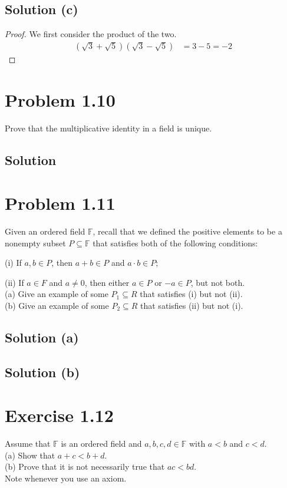 \documentclass[12pt]{report}
\begin{document}
\subsection{Solution (c)}
\begin{proof}
    We first consider the product of the two.
    \begin{align}
        (\sqrt{3} + \sqrt{5})(\sqrt{3} - \sqrt{5})
            &=  3 - 5
            =   -2
    \end{align}
\end{proof}

\pagebreak
\section{Problem 1.10}
Prove that the multiplicative identity in a field is unique. 

\subsection{Solution}


\pagebreak
\section{Problem 1.11}
Given an ordered field $\mathbb{F}$, recall that we defined the positive elements to be a nonempty subset $P \subseteq \mathbb{F}$ that satisfies both of the following conditions:

(i) If $a, b \in P$, then $a + b \in P$ and $a \cdot b \in P$;  

(ii) If $a \in F$ and $a \ne 0$, then either $a \in P$ or $-a \in P$, but not  both. \\
(a) Give an example of some $P_1 \subseteq R$ that satisfies (i) but not (ii).\\
(b) Give an example of some $P_2 \subseteq R$ that satisfies (ii) but not (i). 

\subsection{Solution (a)}

\subsection{Solution (b)}


\pagebreak
\section{Exercise 1.12}
Assume that $\mathbb{F}$ is an ordered field and $a, b, c, d \in \mathbb{F}$ with $a<b$ and $c<d$. \\
(a) Show that $a + c < b + d$. \\
(b) Prove that it is not necessarily true that $ac < bd$. \\
Note whenever you use an axiom. 
\end{document}
